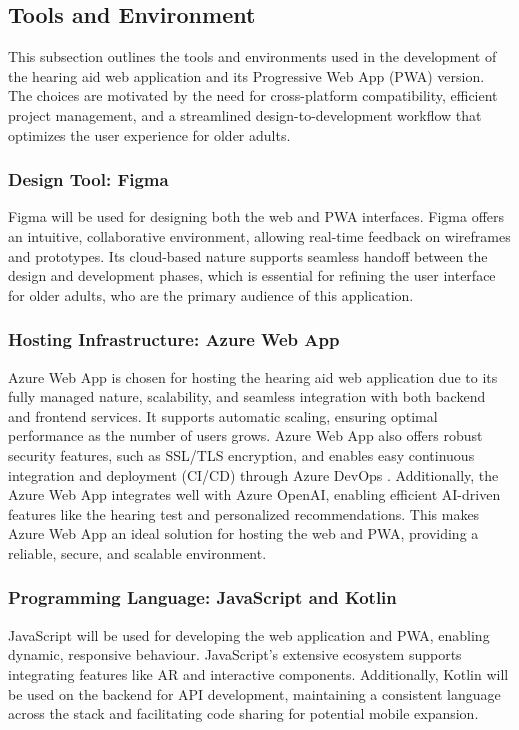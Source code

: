 \documentclass{article}
\begin{document}
\subsection{Tools and Environment}
This subsection outlines the tools and environments used in the development of the hearing aid web application and its Progressive Web App (PWA) version. The choices are motivated by the need for cross-platform compatibility, efficient project management, and a streamlined design-to-development workflow that optimizes the user experience for older adults.

\subsubsection{Design Tool: Figma}
Figma will be used for designing both the web and PWA interfaces. Figma offers an intuitive, collaborative environment, allowing real-time feedback on wireframes and prototypes. Its cloud-based nature supports seamless handoff between the design and development phases, which is essential for refining the user interface for older adults, who are the primary audience of this application.

\subsubsection{Hosting Infrastructure: Azure Web App}
Azure Web App is chosen for hosting the hearing aid web application due to its fully managed nature, scalability, and seamless integration with both backend and frontend services. It supports automatic scaling, ensuring optimal performance as the number of users grows. Azure Web App also offers robust security features, such as SSL/TLS encryption, and enables easy continuous integration and deployment (CI/CD) through Azure DevOps \cite{azureappservice}. Additionally, the Azure Web App integrates well with Azure OpenAI, enabling efficient AI-driven features like the hearing test and personalized recommendations. This makes Azure Web App an ideal solution for hosting the web and PWA, providing a reliable, secure, and scalable environment.

\subsubsection{Programming Language: JavaScript and Kotlin}
JavaScript will be used for developing the web application and PWA, enabling dynamic, responsive behaviour. JavaScript's extensive ecosystem supports integrating features like AR and interactive components. Additionally, Kotlin will be used on the backend for API development, maintaining a consistent language across the stack and facilitating code sharing for potential mobile expansion.
\end{document}
